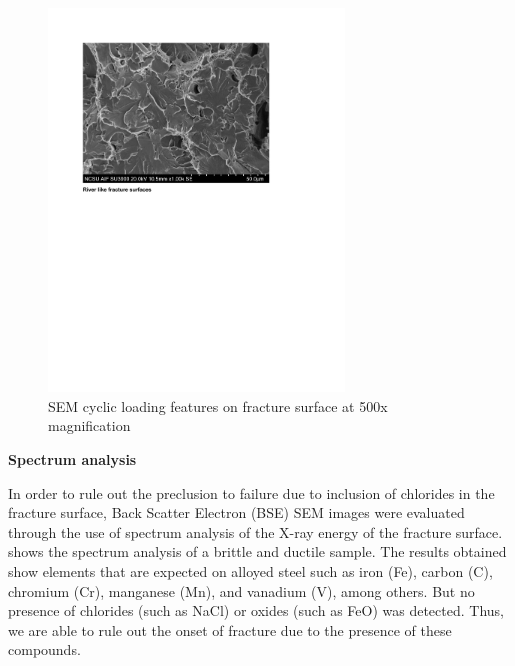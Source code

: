 \begin{figure}[htbp]
	\centering
	\includegraphics[width=0.7\textwidth]{VAC Thesis 2.0/Chapter-4/figs/BBT_RiverFeatures.pdf}
	\caption{SEM cyclic loading features on fracture surface at 500x magnification}
	\label{fig:RiverFeatures}
\end{figure}

\textbf{Spectrum analysis}

In order to rule out the preclusion to failure due to inclusion of chlorides in the fracture surface, Back Scatter Electron (BSE) SEM images were evaluated through the use of spectrum analysis of the X-ray energy of the fracture surface.  shows the spectrum analysis of a brittle and ductile sample. The results obtained show elements that are expected on alloyed steel such as iron (Fe), carbon (C), chromium (Cr), manganese (Mn), and vanadium (V), among others. But no presence of chlorides (such as NaCl) or oxides (such as FeO) was detected. Thus, we are able to rule out the onset of fracture due to the presence of these compounds.

